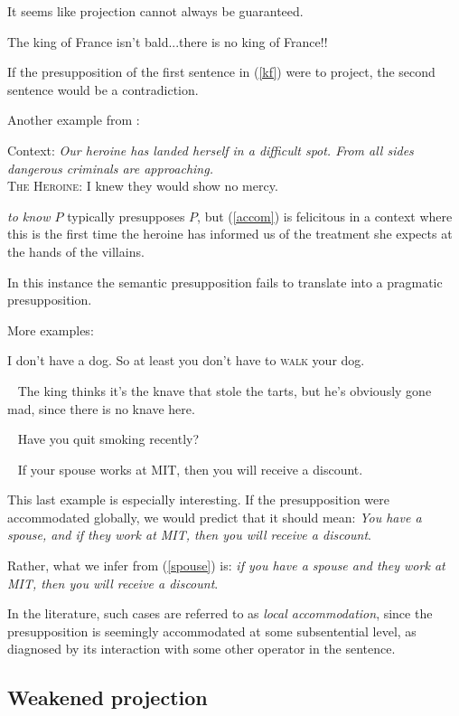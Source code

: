 \documentclass[cronos,landscape,paper=letter]{ling-handout}
\begin{document}
It seems like projection cannot always be guaranteed.

\ex
\label{kf}The king of France isn't bald...there is no king of France!!
\xe

If the presupposition of the first sentence in (\ref{kf}) were to project, the second sentence would be a contradiction.


Another example from \cite{beaverZeevat2007}:

\ex\label{accom}
Context: \textit{Our heroine has landed herself in a difficult spot. From all sides dangerous criminals are approaching.}\\
\textsc{The Heroine:} I knew they would show no mercy.
\xe

\textit{to know \(P\)} typically presupposes \(P\), but (\ref{accom}) is felicitous in a context where this is the first time the heroine has informed us of the treatment she expects at the hands of the villains.

In this instance the semantic presupposition fails to translate into a pragmatic presupposition.

More examples:

\pex
\a I don't have a dog.
\a So at least you don't have to \textsc{walk} your dog.\hfill \cite[p.\,145]{kadmon2001}
\xe

\ex~
The king thinks it's the knave that stole the tarts, but he's obviously gone mad, since there is no knave here.\hfill \cite{beaverGuerts2014}
\xe

\ex~
Have you quit smoking recently?
\xe

\ex~
\label{spouse}If your spouse works at MIT, then you will receive a discount.
\xe

This last example is especially interesting. If the presupposition were accommodated globally, we would predict that it should mean: \textit{You have a spouse, and if they work at MIT, then you will receive a discount}.

Rather, what we infer from (\ref{spouse}) is: \textit{if you have a spouse and they work at MIT, then you will receive a discount}.

In the literature, such cases are referred to as \textit{local accommodation}, since the presupposition is seemingly accommodated at some subsentential level, as diagnosed by its interaction with some other operator in the sentence.

\subsection{Weakened projection}
\end{document}
